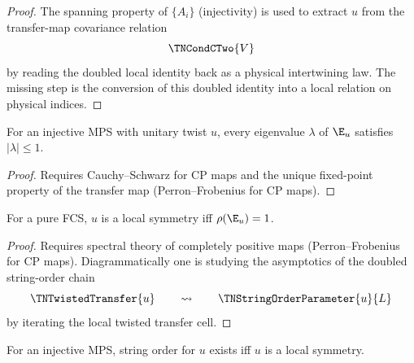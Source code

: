 \begin{proof}
    \notready
    The spanning property of $\{A_i\}$ (injectivity) is used to
    extract $u$ from the transfer-map covariance relation
    \[
        \TNCondCTwo{V}
    \]
    by reading the doubled local identity back as a physical intertwining law.
    The missing step is the conversion of this doubled identity into a
    local relation on physical indices.
\end{proof}

\begin{theorem}\label{thm:twisted_transfer_spectral_radius_le_one}
    \notready
    For an injective MPS with unitary twist $u$, every eigenvalue
    $\lambda$ of $\E_u$ satisfies $|\lambda| \le 1$.
\end{theorem}

\begin{proof}
    \notready
    Requires Cauchy--Schwarz for CP maps and the unique fixed-point
    property of the transfer map (Perron--Frobenius for CP maps).
\end{proof}

\begin{theorem}%
    \label{thm:local_symmetry_iff_spectral_radius}
    \notready
    For a pure FCS, $u$ is a local symmetry iff $\rho(\E_u) = 1$.
\end{theorem}

\begin{proof}
    \notready
    Requires spectral theory of completely positive maps
    (Perron--Frobenius for CP maps).  Diagrammatically one is studying the
    asymptotics of the doubled string-order chain
    \[
        \TNTwistedTransfer{u}
        \qquad\rightsquigarrow\qquad
        \TNStringOrderParameter{u}{L}
    \]
    by iterating the local twisted transfer cell.
\end{proof}

\begin{theorem}%
    \label{thm:string_order_iff_local_symmetry}
    \notready
    For an injective MPS, string order for $u$ exists iff $u$ is a
    local symmetry.
\end{theorem}

